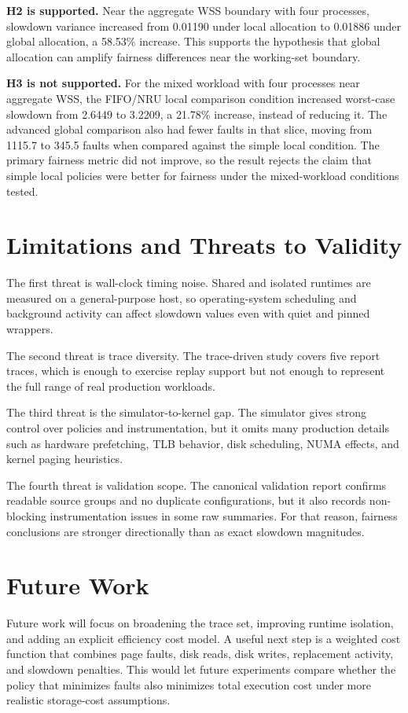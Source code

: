 \documentclass[conference]{IEEEtran}
\begin{document}
\textbf{H2 is supported.} Near the aggregate WSS boundary with four processes, slowdown variance increased from 0.01190 under local allocation to 0.01886 under global allocation, a 58.53\% increase. This supports the hypothesis that global allocation can amplify fairness differences near the working-set boundary.

\textbf{H3 is not supported.} For the mixed workload with four processes near aggregate WSS, the FIFO/NRU local comparison condition increased worst-case slowdown from 2.6449 to 3.2209, a 21.78\% increase, instead of reducing it. The advanced global comparison also had fewer faults in that slice, moving from 1115.7 to 345.5 faults when compared against the simple local condition. The primary fairness metric did not improve, so the result rejects the claim that simple local policies were better for fairness under the mixed-workload conditions tested.

\section{Limitations and Threats to Validity}
The first threat is wall-clock timing noise. Shared and isolated runtimes are measured on a general-purpose host, so operating-system scheduling and background activity can affect slowdown values even with quiet and pinned wrappers.

The second threat is trace diversity. The trace-driven study covers five report traces, which is enough to exercise replay support but not enough to represent the full range of real production workloads.

The third threat is the simulator-to-kernel gap. The simulator gives strong control over policies and instrumentation, but it omits many production details such as hardware prefetching, TLB behavior, disk scheduling, NUMA effects, and kernel paging heuristics.

The fourth threat is validation scope. The canonical validation report confirms readable source groups and no duplicate configurations, but it also records non-blocking instrumentation issues in some raw summaries. For that reason, fairness conclusions are stronger directionally than as exact slowdown magnitudes.

\section{Future Work}
Future work will focus on broadening the trace set, improving runtime isolation, and adding an explicit efficiency cost model. A useful next step is a weighted cost function that combines page faults, disk reads, disk writes, replacement activity, and slowdown penalties. This would let future experiments compare whether the policy that minimizes faults also minimizes total execution cost under more realistic storage-cost assumptions.
\end{document}
